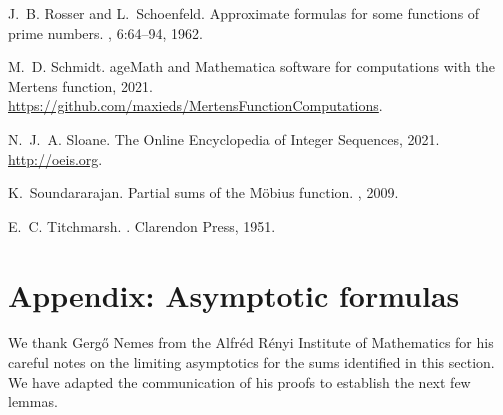 \documentclass[11pt,reqno,a4letter]{article}
\numberwithin{figure}{section}
\numberwithin{table}{section}
\theoremstyle{plain}
\numberwithin{theorem}{section}
\theoremstyle{definition}
\begin{document}
\begin{thebibliography}{10}
J.~B. Rosser and L.~Schoenfeld.
\newblock Approximate formulas for some functions of prime numbers.
, 6:64--94, 1962.

M.~D. Schmidt.
age{M}ath and {M}athematica software for computations with the
  {M}ertens function, 2021.
\newblock \url{https://github.com/maxieds/MertensFunctionComputations}.

N.~J.~A. Sloane.
\newblock The {O}nline {E}ncyclopedia of {I}nteger {S}equences, 2021.
\newblock \url{http://oeis.org}.

K.~Soundararajan.
\newblock Partial sums of the {M}{\"{o}}bius function.
, 2009.

E.~C. Titchmarsh.
.
\newblock Clarendon Press, 1951.

\end{thebibliography}

\setcounter{section}{0} 
\renewcommand{\thesection}{\Alph{section}} 

\newpage
\section{Appendix: Asymptotic formulas} 
\label{subSection_OtherFactsAndResults} 

We thank Gerg\H{o} Nemes from the Alfr\'{e}d R\'{e}nyi Institute of Mathematics for his 
careful notes on the limiting asymptotics for the sums identified in this section. 
We have adapted the communication of his proofs to establish the next few lemmas. 
\end{document}
